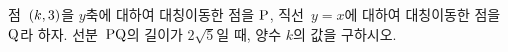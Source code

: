 점~$(k{,}\mkern3mu\mathopen{}3)$을 $y$축에 대하여 대칭이동한 점을 $\mathrm{P}$, 직선~$y=x$에 대하여 대칭이동한 점을 $\mathrm{Q}$라 하자. 선분~$\mathrm{PQ}$의 길이가 $2\sqrt{5}$일 때, 양수 $k$의 값을 구하시오.

